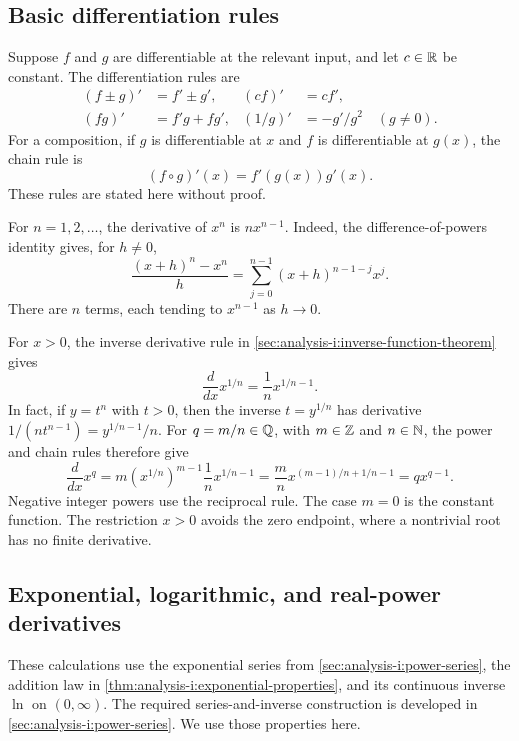 \subsection{Basic differentiation rules}
Suppose $f$ and $g$ are differentiable at the relevant input, and let
$c\in\mathbb{R}$ be constant. The differentiation rules are
\[
  \begin{aligned}
    (f\pm g)'&=f'\pm g',& (cf)'&=cf',\\
    (fg)'&=f'g+fg',& (1/g)'&=-g'/g^2\quad(g\ne0).
  \end{aligned}
\]
For a composition, if $g$ is differentiable at $x$ and $f$ is
differentiable at $g(x)$, the chain rule is
\[
  (f\circ g)'(x)=f'(g(x))g'(x).
\]
These rules are stated here without proof.

\begin{example}
  For $n=1,2,\ldots$, the derivative of $x^n$ is $nx^{n-1}$.
  Indeed, the difference-of-powers identity gives, for $h\ne0$,
  \[
    \frac{(x+h)^n-x^n}{h}
      =\sum_{j=0}^{n-1}(x+h)^{n-1-j}x^j.
  \]
  There are $n$ terms, each tending to $x^{n-1}$ as $h\to0$.
\end{example}

\begin{example}
  For $x>0$, the inverse derivative rule in
  \autoref{sec:analysis-i:inverse-function-theorem} gives
  \[
    \frac{d}{dx}x^{1/n}=\frac1n x^{1/n-1}.
  \]
  In fact, if $y=t^n$ with $t>0$, then the inverse $t=y^{1/n}$ has
  derivative $1/(nt^{n-1})=y^{1/n-1}/n$.
  For $q=m/n\in\mathbb{Q}$, with $m\in\mathbb{Z}$ and $n\in\mathbb{N}$, the power and chain
  rules therefore give
  \[
    \frac{d}{dx}x^q
      =m(x^{1/n})^{m-1}\frac1n x^{1/n-1}
      =\frac mn x^{(m-1)/n+1/n-1}
      =q x^{q-1}.
  \]
  Negative integer powers use the reciprocal rule.
  The case $m=0$ is the constant function. The restriction $x>0$ avoids
  the zero endpoint, where a nontrivial root has no finite derivative.
\end{example}

\subsection{Exponential, logarithmic, and real-power derivatives}
These calculations use the exponential series from
\autoref{sec:analysis-i:power-series}, the addition law in
\autoref{thm:analysis-i:exponential-properties}, and its continuous
inverse $\ln$ on $(0,\infty)$. The required series-and-inverse
construction is developed in \autoref{sec:analysis-i:power-series}.
We use those properties here.

